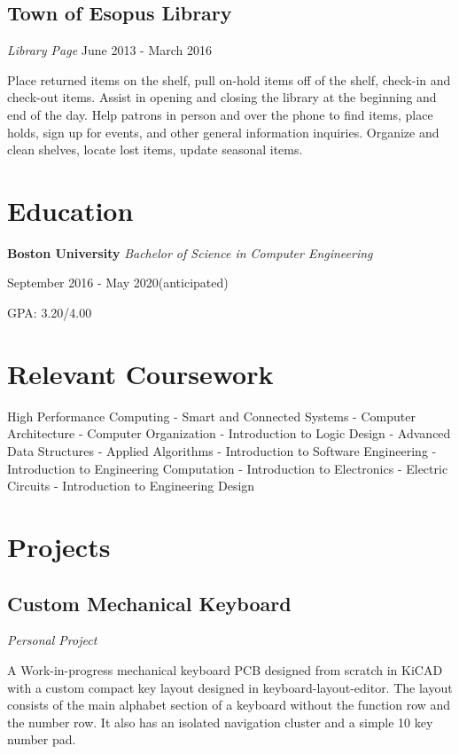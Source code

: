 \documentclass{article}
\begin{document}
\subsection{Town of Esopus Library} \textit{Library Page}
  June 2013 - March 2016

Place returned items on the shelf, pull on-hold items off of the shelf, check-in and check-out items. Assist in opening and closing the library at the beginning and end of the day. Help patrons in person and over the phone to find items, place holds, sign up for events, and other general information inquiries. Organize and clean shelves, locate lost items, update seasonal items.

\vspace{-.75em}
\section{Education}
\textbf{Boston University}  \textit{Bachelor of Science in Computer Engineering}

September 2016 - May 2020(anticipated)

GPA: 3.20/4.00

\vspace{-.75em}
\section{Relevant Coursework}
{\centering
High Performance Computing - Smart and Connected Systems - Computer Architecture - Computer Organization - Introduction to Logic Design - Advanced Data Structures - Applied Algorithms - Introduction to Software Engineering - Introduction to Engineering Computation - Introduction to Electronics - Electric Circuits - Introduction to Engineering Design
\par
}

\vspace{-.75em}
\section{Projects}
\subsection{Custom Mechanical Keyboard} \textit{Personal Project}

A Work-in-progress mechanical keyboard PCB designed from scratch in KiCAD with a custom compact key layout designed in keyboard-layout-editor. The layout consists of the main alphabet section of a keyboard without the function row and the number row. It also has an isolated navigation cluster and a simple 10 key number pad.
\vspace{-.75em}
\end{document}
